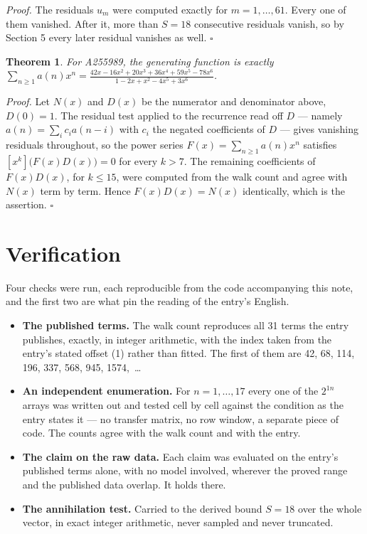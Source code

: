 \documentclass[11pt]{article}
\newtheorem{theorem}{Theorem}
\theoremstyle{definition}
\begin{document}
{\itshape Proof.} The residuals $u_m$ were computed exactly for $m = 1,\dots,61$. Every one of them vanished. After it, more than $S = 18$ consecutive residuals vanish, so by Section 5 every later residual vanishes as well. $\square$

\begin{theorem} For A255989, the generating function is exactly $\sum_{n\ge 1} a(n)x^n = \frac{42x - 16x^{2} + 20x^{3} + 36x^{4} + 59x^{5} - 78x^{6}}{1 - 2x + x^{2} - 4x^{5} + 3x^{6}}$.\end{theorem}

{\itshape Proof.} Let $N(x)$ and $D(x)$ be the numerator and denominator above, $D(0)=1$. The residual test applied to the recurrence read off $D$ --- namely $a(n) = \sum_i c_i a(n-i)$ with $c_i$ the negated coefficients of $D$ --- gives vanishing residuals throughout, so the power series $F(x)=\sum_{n\ge 1}a(n)x^n$ satisfies $[x^k]\bigl(F(x)D(x)\bigr) = 0$ for every $k > 7$. The remaining coefficients of $F(x)D(x)$, for $k \le 15$, were computed from the walk count and agree with $N(x)$ term by term. Hence $F(x)D(x) = N(x)$ identically, which is the assertion. $\square$

\section{Verification}

Four checks were run, each reproducible from the code accompanying this note, and the first two are what pin the reading of the entry's English.

\begin{itemize}

\item {\bfseries The published terms.} The walk count reproduces all 31 terms the entry publishes, exactly, in integer arithmetic, with the index taken from the entry's stated offset (1) rather than fitted. The first of them are 42, 68, 114, 196, 337, 568, 945, 1574,~\dots

\item {\bfseries An independent enumeration.} For $n = 1,\dots,17$ every one of the $2^{1n}$ arrays was written out and tested cell by cell against the condition as the entry states it --- no transfer matrix, no row window, a separate piece of code. The counts agree with the walk count and with the entry.

\item {\bfseries The claim on the raw data.} Each claim was evaluated on the entry's published terms alone, with no model involved, wherever the proved range and the published data overlap. It holds there.

\item {\bfseries The annihilation test.} Carried to the derived bound $S = 18$ over the whole vector, in exact integer arithmetic, never sampled and never truncated.

\end{itemize}
\end{document}
